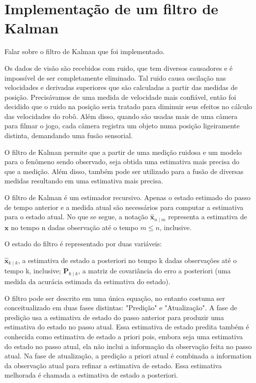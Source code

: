 \chapter{Implementação de um filtro de Kalman}\label{cap:kalman}

Falar sobre o filtro de Kalman que foi implementado.

Os dados de visão são recebidos com ruido, que tem diversos causadores e é impossível de ser completamente eliminado. Tal ruido causa oscilação nas velocidades e derivadas superiores que são calculadas a partir das medidas de posição. Precisávamos de uma medida de velocidade mais confiável, então foi decidido que o ruido na posição seria tratado para diminuir seus efeitos no cálculo das velocidades do robô. Além disso, quando são usadas mais de uma câmera para filmar o jogo, cada câmera registra um objeto numa posição ligeiramente distinta, demandando uma fusão sensorial.

O filtro de Kalman permite que a partir de uma medição ruidosa e um modelo para o fenômeno sendo observado, seja obtida uma estimativa mais precisa do que a medição. Além disso, também pode ser utilizado para a fusão de diversas medidas resultando em uma estimativa mais precisa.

O filtro de Kalman é um estimador recursivo. Apenas o estado estimado do passo de tempo anterior e a medida atual são necessários para computar a estimativa para o estado atual. No que se segue, a notação $\displaystyle {\hat {\mathbf {x} }}_{n\mid m}$ representa a estimativa de ${\displaystyle \mathbf {x} }$ no tempo n dadas observação até o tempo $m \leq n$, inclusive.

O estado do filtro é representado por duas variáveis:

   ${\displaystyle {\hat {\mathbf {x} }}_{k\mid k}}$, a estimativa de estado a posteriori no tempo k dadas observações até o tempo k, inclusive;
   ${\displaystyle \mathbf {P} _{k\mid k}}$, a matriz de covariância do erro a posteriori (uma medida da acurácia estimada da estimativa do estado).

O filtro pode ser descrito em uma única equação, no entanto costuma ser conceitualizado em duas fases distintas: "Predição" e "Atualização". A fase de predição usa a estimativa de estado do passo anterior para produzir uma estimativa do estado no passo atual. Essa estimativa de estado predita também é conhecida como estimativa de estado a priori pois, embora seja uma estimativa do estado no passo atual, ela não inclui a informação da observação feita no passo atual. Na fase de atualização, a predição a priori atual é combinada a information da observação atual para refinar a estimativa de estado. Essa estimativa melhorada é chamada a estimativa de estado a posteriori.

